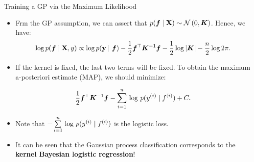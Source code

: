 \begin{frame}[c,allowframebreaks]{Training a GP via the Maximum Likelihood}
\begin{itemize}
\vspace{-0.5cm}
\begin{eqnarray*}p(\bm{f}\mid\Xmat, \ydat) &=&  \frac{p(\ydat\mid\bm{f}, \Xmat) \cdot p(\bm{f}\mid\Xmat)}{p(\ydat\mid\Xmat)} \propto p(\ydat\mid\bm{f}) \cdot p(\bm{f}\mid\Xmat),\end{eqnarray*}
\vspace{-2mm}
where, the denominator is independent of $\bm{f}$ and hence has been dropped.

\vspace{15mm}

\item Frm the GP assumption, we can assert that $p(\bm{f}\mid\mathbf{X}) \sim \mathcal{N}\left(0, \bm{K}\right)$. Hence, we have:
\vspace{-2mm}
$$\log p(\bm{f}\mid\mathbf{X}, y) \propto \log p(\mathbf{y}\mid\bm{f}) - \frac{1}{2} \bm{f}^\top \bm{K}^{-1} \bm{f} - \frac{1}{2} \log |\bm{K}| - \frac{n}{2} \log 2 \pi.$$

\end{itemize}


\framebreak

\begin{itemize}

\item If the kernel is fixed, the last two terms will be fixed. To obtain the maximum a-posteriori estimate (MAP), we should minimize:

$$\frac{1}{2} \bm{f}^\top \bm{K}^{-1}\bm{f} - \sum\limits_{i=1}^n\, \log\, p(y^{(i)}\mid f^{(i)}) + C.$$

\vspace{0.5cm}
\item Note that $-\sum\limits_{i=1}^n\,\log \,p(y^{(i)}\mid f^{(i)})$ is the logistic loss.

\vspace{0.7cm}
\item It can be seen that the Gaussian process classification corresponds to the \textbf{kernel Bayesian logistic regression}!
\end{itemize}

\end{frame}




